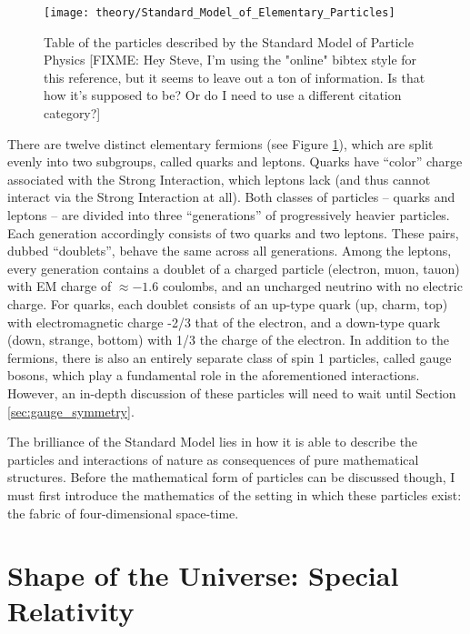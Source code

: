     \begin{figure}[h!]
        \texttt{[image: theory/Standard\_Model\_of\_Elementary\_Particles]}
        \caption{Table of the particles described by the Standard Model of Particle Physics\cite{wikimedia_sm}
            [FIXME: Hey Steve, I'm using the "online" bibtex style for this reference, but it seems to leave out a ton of information.
                Is that how it's supposed to be? Or do I need to use a different citation category?]}
        \label{fig:sm_particles}
    \end{figure}

    There are twelve distinct elementary fermions (see Figure \ref{fig:sm_particles}),
        which are split evenly into two subgroups, called quarks and leptons.
    Quarks have ``color'' charge associated with the Strong Interaction,
        which leptons lack (and thus cannot interact via the Strong Interaction at all).
    Both classes of particles -- quarks and leptons -- are divided into three ``generations'' of progressively heavier particles.
    Each generation accordingly consists of two quarks and two leptons.
    These pairs, dubbed ``doublets'', behave the same across all generations.
    Among the leptons, every generation contains a doublet of a charged particle (electron, muon, tauon) with EM charge of $\approx −1.6$ coulombs,
        and an uncharged neutrino with no electric charge.
    For quarks, each doublet consists of an up-type quark (up, charm, top) with electromagnetic charge -2/3 that of the electron,
        and a down-type quark (down, strange, bottom) with 1/3 the charge of the electron.
    In addition to the fermions, there is also an entirely separate class of spin 1 particles, called gauge bosons,
        which play a fundamental role in the aforementioned interactions.
    However, an in-depth discussion of these particles will need to wait until Section \ref{sec:gauge_symmetry}.

    The brilliance of the Standard Model lies in how it is able to describe the 
        particles and interactions of nature as consequences of pure mathematical structures.
    Before the mathematical form of particles can be discussed though,
        I must first introduce the mathematics of the setting in which these particles exist:
        the fabric of four-dimensional space-time.


\FloatBarrier
\section{Shape of the Universe: Special Relativity}

